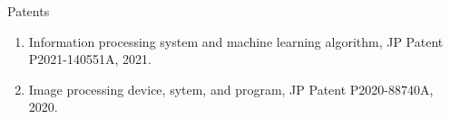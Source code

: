 \begin{rSection}{Patents}
\begin{enumerate}
    \item Information processing system and machine learning algorithm, JP Patent P2021-140551A, 2021.
    \item Image processing device, sytem, and program, JP Patent P2020-88740A, 2020.
\end{enumerate}
\end{rSection}